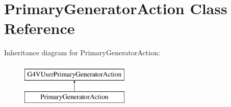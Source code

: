 \hypertarget{class_primary_generator_action}{}\section{Primary\+Generator\+Action Class Reference}
\label{class_primary_generator_action}
Inheritance diagram for Primary\+Generator\+Action\+:\begin{figure}[H]
\begin{center}
\leavevmode
\includegraphics[height=2.000000cm]{class_primary_generator_action}
\end{center}
\end{figure}
